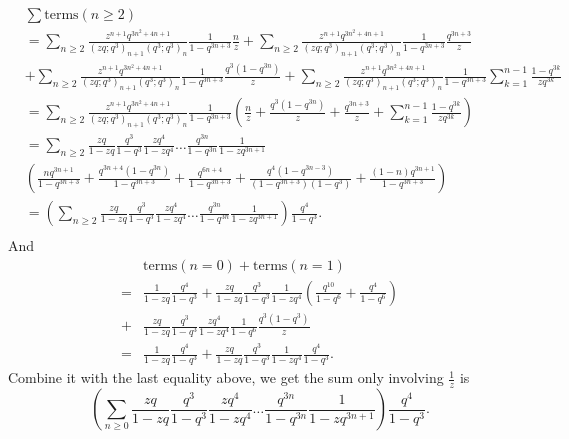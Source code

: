 \documentclass[draft]{amsart}
\numberwithin{equation}{section}
\theoremstyle{plain}
\theoremstyle{remark}
\begin{document}
\begin{align*}
&\sum\mbox{terms}(n\geq 2)\\\nonumber
&=\sum_{n\geq 2}\frac{z^{n+1}q^{3n^{2}+4n+1}}{(zq;q^{3})_{n+1}(q^{3};q^{3})_{n}} \frac{1}{1-q^{3n+3}}\frac{n}{z}
+\sum_{n\geq 2}\frac{z^{n+1}q^{3n^{2}+4n+1}}{(zq;q^{3})_{n+1}(q^{3};q^{3})_{n}}\frac{1}{1-q^{3n+3}}\frac{q^{3n+3}}{z}\\  \nonumber
&+\sum_{n\geq 2}\frac{z^{n+1}q^{3n^{2}+4n+1}}{(zq;q^{3})_{n+1}(q^{3};q^{3})_{n}} \frac{1}{1-q^{3n+3}} \frac{q^{3}(1-q^{3n})}{z} 
+\sum_{n\geq 2}\frac{z^{n+1}q^{3n^{2}+4n+1}}{(zq;q^{3})_{n+1}(q^{3};q^{3})_{n}} \frac{1}{1-q^{3n+3}}\sum_{k=1} ^{n-1}\frac{1-q^{3k}}{zq^{3k}}\\   \nonumber
&=\sum_{n\geq 2}\frac{z^{n+1}q^{3n^{2}+4n+1}}{(zq;q^{3})_{n+1}(q^{3};q^{3})_{n}}\frac{1}{1-q^{3n+3}}
\left(      \frac{n}{z}   +  \frac{q^{3}(1-q^{3n})}{z}       + \frac{q^{3n+3}}{z}    + \sum_{k=1}^{n-1} \frac{1-q^{3k}}{zq^{3k}}\right)\\\nonumber
&=\sum_{n\geq 2}\frac{zq}{1-zq}\frac{q^{3}}{1-q^{3}} \frac{zq^{4}}{1-zq^{4}}\dots\frac{q^{3n}}{1-q^{3n}}\frac{1}{1-zq^{3n+1}}\\\nonumber
&\left(      \frac{nq^{3n+1}}{1-q^{3n+3}}   +  \frac{q^{3n+4}(1-q^{3n})}{1-q^{3n+3}}       + \frac{q^{6n+4}}{1-q^{3n+3}}    + \frac{q^{4}(1-q^{3n-3})}{(1-q^{3n+3})(1-q^{3})}    +\frac{(1-n)q^{3n+1}}{1-q^{3n+3}}\right)\\ \nonumber
&=\left(\sum_{n\geq 2}\frac{zq}{1-zq}\frac{q^{3}}{1-q^{3}} \frac{zq^{4}}{1-zq^{4}}\dots\frac{q^{3n}}{1-q^{3n}}\frac{1}{1-zq^{3n+1}}\right)\frac{q^{4}}{1-q^{3}}.\\\nonumber
\end{align*} 
And
 \begin{align*}
&\mbox{terms}(n=0) + \mbox{terms}(n=1)\\
=&\frac{1}{1-zq}\frac{q^{4}}{1-q^{3}}+\frac{zq}{1-zq}\frac{q^{3}}{1-q^{3}}\frac{1}{1-zq^{4}}\left(  \frac{q^{10}}{1-q^{6}}+\frac{q^{4}}{1-q^{6}} \right)\\
+&\frac{zq}{1-zq}\frac{q^{3}}{1-q^{3}}\frac{zq^{4}}{1-zq^{4}}\frac{1}{1-q^{6}}\frac{q^{3}(1-q^{3})}{z}\\
=&\frac{1}{1-zq}\frac{q^{4}}{1-q^{3}}+\frac{zq}{1-zq}\frac{q^{3}}{1-q^{3}}\frac{1}{1-zq^{4}}\frac{q^{4}}{1-q^{3}}. 
\end{align*}
Combine it with the last equality above, we get the sum only involving $\frac{1}{z}$ is 
\begin{equation}\label{3.15}%
\left(\sum_{n\geq 0}\frac{zq}{1-zq}\frac{q^{3}}{1-q^{3}} \frac{zq^{4}}{1-zq^{4}}\dots\frac{q^{3n}}{1-q^{3n}}\frac{1}{1-zq^{3n+1}}\right)\frac{q^{4}}{1-q^{3}}.
\end{equation}
\end{document}
